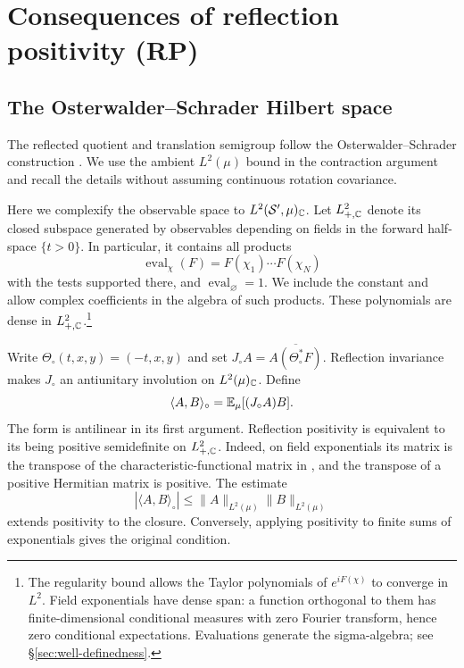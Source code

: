 \section{Consequences of reflection positivity (RP)}\label{sec:RP}

\subsection{The Osterwalder--Schrader Hilbert space}

The reflected quotient and translation semigroup follow the
Osterwalder--Schrader construction \cite[\S4.1, (4.3)--(4.9)]{OS}.
We use the ambient $L^2(\mu)$ bound in the contraction argument and
recall the details without assuming continuous rotation covariance.

Here we complexify the observable space to $L^2(\mathcal{S}',\mu)_{\mathbb{C}}$.
Let $L^2_{+,\mathbb{C}}$ denote its closed subspace generated by observables
depending on fields in the forward half-space
$\{t>0\}$. In particular, it contains all products
\begin{equation}
 \operatorname{eval}_\chi(F)=F(\chi_1)\cdots F(\chi_N)
\end{equation}
with the tests supported there, and $\operatorname{eval}_\varnothing=1$.
We include the constant and allow complex coefficients in the algebra of such products.
These polynomials are dense in $L^2_{+,\mathbb{C}}$.\footnote{The regularity bound
allows the Taylor polynomials of $e^{iF(\chi)}$ to converge in $L^2$.
Field exponentials have dense span: a function orthogonal to them has
finite-dimensional conditional measures with zero Fourier transform,
hence zero conditional expectations. Evaluations generate the
sigma-algebra; see \S\ref{sec:well-definedness}.}

Write $\Theta_\circ(t,x,y)=(-t,x,y)$ and set
$J_\circ A=\overline{A(\Theta_\circ^*F)}$. Reflection invariance makes
$J_\circ$ an antiunitary involution on $L^2(\mu)_{\mathbb{C}}$. Define
\begin{equation}\label{eq:OS-form}
 \langle A,B\rangle_\circ=\mathbb{E}_\mu[(J_\circ A)B].
\end{equation}
The form is antilinear in its first argument. Reflection positivity is
equivalent to its being positive semidefinite on $L^2_{+,\mathbb{C}}$.
Indeed, on field exponentials its matrix is the transpose of the
characteristic-functional matrix in , and the transpose
of a positive Hermitian matrix is positive. The estimate
\begin{equation}\label{eq:class-contraction}
 |\langle A,B\rangle_\circ|\leq\|A\|_{L^2(\mu)}\|B\|_{L^2(\mu)}
\end{equation}
extends positivity to the closure. Conversely, applying positivity to
finite sums of exponentials gives the original condition.

